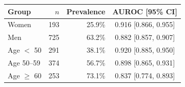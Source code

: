 \begin{tabular}{lrrc}
\toprule
Group & $n$ & Prevalence & AUROC [95\% CI] \\
\midrule
Women & 193 & 25.9\% & 0.916 [0.866, 0.955] \\
Men & 725 & 63.2\% & 0.882 [0.857, 0.907] \\
Age $<$ 50 & 291 & 38.1\% & 0.920 [0.885, 0.950] \\
Age 50--59 & 374 & 56.7\% & 0.898 [0.865, 0.931] \\
Age $\geq$ 60 & 253 & 73.1\% & 0.837 [0.774, 0.893] \\
\bottomrule
\end{tabular}
